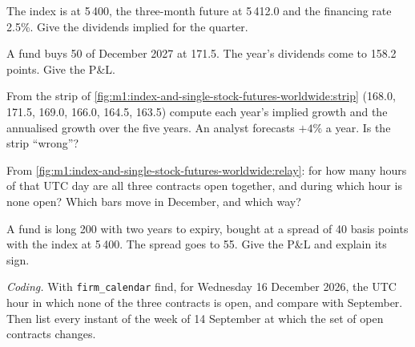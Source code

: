 \begin{exercise}[$\star$]\label{exo:m1:index-and-single-stock-futures-worldwide:2}
The index is at 5\,400, the three-month future at 5\,412.0 and the financing
rate 2.5\%. Give the dividends implied for the quarter.
\end{exercise}

\begin{exercise}[$\star$]\label{exo:m1:index-and-single-stock-futures-worldwide:3}
A fund buys 50  of December 2027 at 171.5. The year's
dividends come to 158.2 points. Give the P\&L.
\end{exercise}

\begin{exercise}[$\star\star$]\label{exo:m1:index-and-single-stock-futures-worldwide:4}
From the strip of \cref{fig:m1:index-and-single-stock-futures-worldwide:strip}
(168.0, 171.5, 169.0, 166.0, 164.5, 163.5) compute each year's implied growth
and the annualised growth over the five years. An analyst forecasts $+4\%$ a
year. Is the strip ``wrong''?
\end{exercise}

\begin{exercise}[$\star\star$]\label{exo:m1:index-and-single-stock-futures-worldwide:5}
From \cref{fig:m1:index-and-single-stock-futures-worldwide:relay}: for how
many hours of that UTC day are all three contracts open together, and during
which hour is none open? Which bars move in December, and which way?
\end{exercise}

\begin{exercise}[$\star\star$]\label{exo:m1:index-and-single-stock-futures-worldwide:6}
A fund is long 200  with two years to expiry, bought at
a spread of 40 basis points with the index at 5\,400. The spread goes to 55.
Give the P\&L and explain its sign.
\end{exercise}

\begin{exercise}[$\star\star\star$]\label{exo:m1:index-and-single-stock-futures-worldwide:7}
\emph{Coding.} With \texttt{firm\_calendar} find, for Wednesday 16 December
2026, the UTC hour in which none of the three contracts is open, and compare
with September. Then list every instant of the week of 14 September at which
the set of open contracts changes.
\end{exercise}

